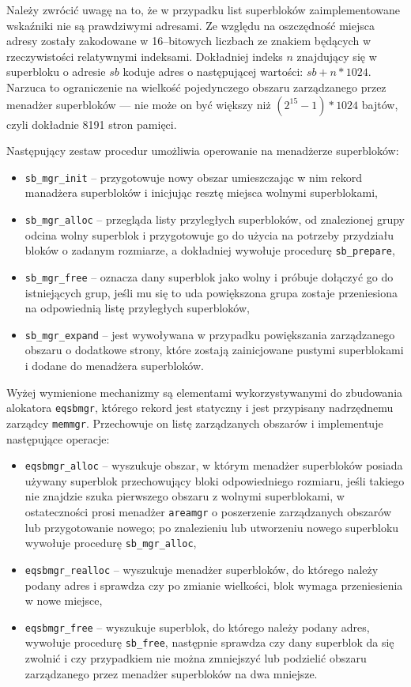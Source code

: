 \documentclass[12pt,a4paper,titlepage,twoside]{mwart}
\begin{document}
Należy zwrócić uwagę na to, że w przypadku list superbloków zaimplementowane
wskaźniki nie są prawdziwymi adresami. Ze względu na oszczędność miejsca adresy
zostały zakodowane w 16--bitowych liczbach ze znakiem będących w rzeczywistości
relatywnymi indeksami. Dokładniej indeks $n$ znajdujący się w superbloku o
adresie $sb$ koduje adres o następującej wartości: $sb + n * 1024$. Narzuca to
ograniczenie na wielkość pojedynczego obszaru zarządzanego przez menadżer
superbloków --- nie może on być większy niż $(2^{15} - 1) * 1024$ bajtów, czyli
dokładnie 8191 stron pamięci.

Następujący zestaw procedur umożliwia operowanie na menadżerze superbloków:
\begin{itemize}
\item \verb+sb_mgr_init+ -- przygotowuje nowy obszar umieszczając w nim rekord
manadżera superbloków i inicjując resztę miejsca wolnymi superblokami,
\item \verb+sb_mgr_alloc+ -- przegląda listy przyległych superbloków, od
znalezionej grupy odcina wolny superblok i przygotowuje go do użycia na
potrzeby przydziału bloków o zadanym rozmiarze, a dokładniej wywołuje procedurę
\verb+sb_prepare+,
\item \verb+sb_mgr_free+ -- oznacza dany superblok jako wolny i próbuje
dołączyć go do istniejących grup, jeśli mu się to uda powiększona grupa zostaje
przeniesiona na odpowiednią listę przyległych superbloków,
\item \verb+sb_mgr_expand+ -- jest wywoływana w przypadku powiększania
zarządzanego obszaru o dodatkowe strony, które zostają zainicjowane pustymi
superblokami i dodane do menadżera superbloków.
\end{itemize}

Wyżej wymienione mechanizmy są elementami wykorzystywanymi do zbudowania
alokatora \texttt{eqsbmgr}, którego rekord jest statyczny i jest przypisany
nadrzędnemu zarządcy \texttt{memmgr}. Przechowuje on listę zarządzanych
obszarów i implementuje następujące operacje:

\begin{itemize}
\item \verb+eqsbmgr_alloc+ -- wyszukuje obszar, w którym menadżer superbloków
posiada używany superblok przechowujący bloki odpowiedniego rozmiaru, jeśli
takiego nie znajdzie szuka pierwszego obszaru z wolnymi superblokami, w
ostateczności prosi menadżer \texttt{areamgr} o poszerzenie zarządzanych
obszarów lub przygotowanie nowego; po znalezieniu lub utworzeniu nowego
superbloku wywołuje procedurę \verb+sb_mgr_alloc+,
\item \verb+eqsbmgr_realloc+ -- wyszukuje menadżer superbloków, do którego
należy podany adres i sprawdza czy po zmianie wielkości, blok wymaga
przeniesienia w nowe miejsce,
\item \verb+eqsbmgr_free+ -- wyszukuje superblok, do którego należy
podany adres, wywołuje procedurę \verb+sb_free+, następnie sprawdza czy dany
superblok da się zwolnić i czy przypadkiem nie można zmniejszyć lub podzielić
obszaru zarządzanego przez menadżer superbloków na dwa mniejsze.
\end{itemize}
\end{document}
